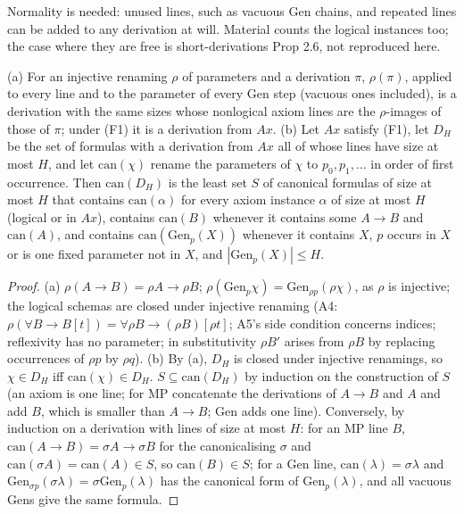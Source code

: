 \noindent Normality is needed: unused lines, such as vacuous Gen chains, and repeated lines can be added to any derivation at will. Material counts the logical instances too; the case where they are free is short-derivations Prop 2.6, not reproduced here.

\begin{lemma}\label{lem:time:renaming}
(a) For an injective renaming $\rho$ of parameters and a derivation $\pi$, $\rho(\pi)$, applied to every line and to the parameter of every Gen step (vacuous ones included), is a derivation with the same sizes whose nonlogical axiom lines are the $\rho$-images of those of $\pi$; under (F1) it is a derivation from $Ax$.
(b) Let $Ax$ satisfy (F1), let $D_H$ be the set of formulas with a derivation from $Ax$ all of whose lines have size at most $H$, and let $\mathrm{can}(\chi)$ rename the parameters of $\chi$ to $p_0,p_1,\dots$ in order of first occurrence. Then $\mathrm{can}(D_H)$ is the least set $S$ of canonical formulas of size at most $H$ that contains $\mathrm{can}(\alpha)$ for every axiom instance $\alpha$ of size at most $H$ (logical or in $Ax$), contains $\mathrm{can}(B)$ whenever it contains some $A\to B$ and $\mathrm{can}(A)$, and contains $\mathrm{can}(\mathrm{Gen}_p(X))$ whenever it contains $X$, $p$ occurs in $X$ or is one fixed parameter not in $X$, and $|\mathrm{Gen}_p(X)|\le H$.
\end{lemma}

\begin{proof}
(a) $\rho(A\to B)=\rho A\to\rho B$; $\rho(\mathrm{Gen}_p\chi)=\mathrm{Gen}_{\rho p}(\rho\chi)$, as $\rho$ is injective; the logical schemas are closed under injective renaming (A4: $\rho(\forall B\to B[t])=\forall\rho B\to(\rho B)[\rho t]$; A5's side condition concerns indices; reflexivity has no parameter; in substitutivity $\rho B'$ arises from $\rho B$ by replacing occurrences of $\rho p$ by $\rho q$).
(b) By (a), $D_H$ is closed under injective renamings, so $\chi\in D_H$ iff $\mathrm{can}(\chi)\in D_H$. $S\subseteq\mathrm{can}(D_H)$ by induction on the construction of $S$ (an axiom is one line; for MP concatenate the derivations of $A\to B$ and $A$ and add $B$, which is smaller than $A\to B$; Gen adds one line). Conversely, by induction on a derivation with lines of size at most $H$: for an MP line $B$, $\mathrm{can}(A\to B)=\sigma A\to\sigma B$ for the canonicalising $\sigma$ and $\mathrm{can}(\sigma A)=\mathrm{can}(A)\in S$, so $\mathrm{can}(B)\in S$; for a Gen line, $\mathrm{can}(\lambda)=\sigma\lambda$ and $\mathrm{Gen}_{\sigma p}(\sigma\lambda)=\sigma\mathrm{Gen}_p(\lambda)$ has the canonical form of $\mathrm{Gen}_p(\lambda)$, and all vacuous Gens give the same formula.
\end{proof}

